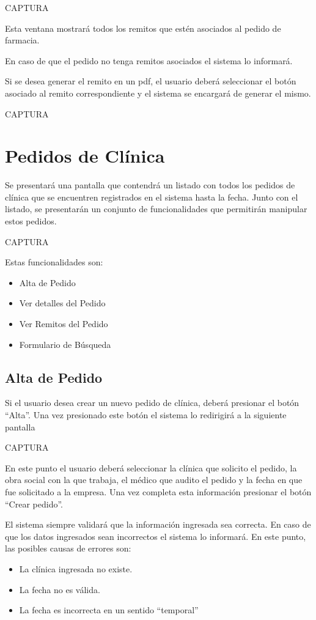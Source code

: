 \documentclass[letterpaper,10pt,spanish]{sphinxmanual}
\begin{document}
CAPTURA

Esta ventana mostrará todos los remitos  que estén asociados al pedido de farmacia.

En caso de que el pedido no tenga remitos asociados el sistema lo informará.

Si se desea generar el remito en un pdf, el usuario deberá seleccionar el botón asociado al remito correspondiente y el sistema se encargará de generar el mismo.

CAPTURA


\section{Pedidos de Clínica}
\label{pedidosclinica:pedidos-de-clinica}\label{pedidosclinica::doc}
Se presentará una pantalla que contendrá un listado con todos los pedidos de clínica que se encuentren registrados en el sistema hasta la fecha. Junto con el listado, se presentarán un conjunto de funcionalidades que permitirán manipular estos pedidos.

CAPTURA

Estas funcionalidades son:
\begin{itemize}
\item {} 
Alta de Pedido

\item {} 
Ver detalles del Pedido

\item {} 
Ver Remitos del Pedido

\item {} 
Formulario de Búsqueda

\end{itemize}


\subsection{Alta de Pedido}
\label{pedidosclinica:alta-de-pedido}
Si el usuario desea crear un nuevo pedido de clínica, deberá presionar el botón “Alta”. Una vez presionado este botón  el sistema lo redirigirá a la siguiente pantalla

CAPTURA

En este punto el usuario deberá seleccionar la clínica que solicito el pedido, la obra social con la que trabaja, el médico que audito el pedido y la fecha en que fue solicitado a la empresa. Una vez completa esta información presionar el botón “Crear pedido”.

El sistema siempre validará que la información ingresada sea correcta. En caso de que los datos ingresados sean incorrectos el sistema lo informará.
En este punto, las posibles causas de errores son:
\begin{itemize}
\item {} 
La clínica ingresada no existe.

\item {} 
La fecha no es válida.

\item {} 
La fecha es incorrecta en un sentido “temporal”

\end{itemize}
\end{document}
